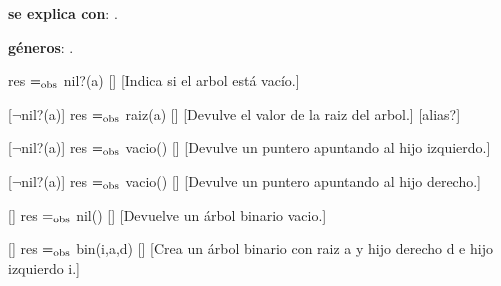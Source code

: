 \begin{Interfaz}
  
  
  \textbf{se explica con}: .
  
  \textbf{g\'eneros}: .


  {res $=_{\mathrm{obs}}$ nil?(a)}
  []
  [Indica si el arbol est\'a vac\'io.]

  [$\neg$nil?(a)]
  {res $=_{\mathrm{obs}}$ raiz(a)}
  []
  [Devulve el valor de la raiz del arbol.]
  [alias?]
  
  [$\neg$nil?(a)]  
  {res $=_{\mathrm{obs}}$ vacio()}
  []
  [Devulve un puntero apuntando al hijo izquierdo.]
  
  [$\neg$nil?(a)]  
  {res $=_{\mathrm{obs}}$ vacio()}
  []
  [Devulve un puntero apuntando al hijo derecho.]
  
  []
  {res $=_{\mathrm{obs}}$ nil()}
  []
  [Devuelve un \'arbol binario vacio.]
  
  []
  {res $=_{\mathrm{obs}}$ bin(i,a,d)}
  []
  [Crea un \'arbol binario con raiz a y hijo derecho d e hijo izquierdo i.]

\end{Interfaz}
